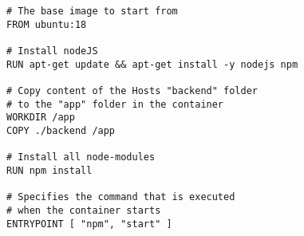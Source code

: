 
\begin{lstlisting}[language=docker, frame=single, caption={Exemplary NodeJS Dockerfile},label=code::docker]
# The base image to start from
FROM ubuntu:18

# Install nodeJS
RUN apt-get update && apt-get install -y nodejs npm

# Copy content of the Hosts "backend" folder
# to the "app" folder in the container
WORKDIR /app
COPY ./backend /app

# Install all node-modules
RUN npm install

# Specifies the command that is executed
# when the container starts
ENTRYPOINT [ "npm", "start" ]

\end{lstlisting}
